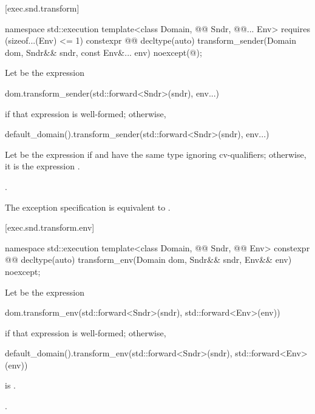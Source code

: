 [exec.snd.transform]{}

%
\begin{itemdecl}
namespace std::execution {
  template<class Domain, @@ Sndr, @@... Env>
      requires (sizeof...(Env) <= 1)
    constexpr @@ decltype(auto) transform_sender(Domain dom, Sndr&& sndr, const Env&... env)
      noexcept(@\seebelow@);
}
\end{itemdecl}

\begin{itemdescr}
\pnum
Let  be the expression
\begin{codeblock}
dom.transform_sender(std::forward<Sndr>(sndr), env...)
\end{codeblock}
if that expression is well-formed; otherwise,
\begin{codeblock}
default_domain().transform_sender(std::forward<Sndr>(sndr), env...)
\end{codeblock}
Let  be the expression 
if  and 
have the same type ignoring cv-qualifiers;
otherwise, it is
the expression .

\pnum
\returns
{}.

\pnum
\remarks
The exception specification is equivalent to
.
\end{itemdescr}

[exec.snd.transform.env]{}

%
\begin{itemdecl}
namespace std::execution {
  template<class Domain, @@ Sndr, @@ Env>
    constexpr @@ decltype(auto) transform_env(Domain dom, Sndr&& sndr, Env&& env) noexcept;
}
\end{itemdecl}

\begin{itemdescr}
\pnum
Let  be the expression
\begin{codeblock}
dom.transform_env(std::forward<Sndr>(sndr), std::forward<Env>(env))
\end{codeblock}
if that expression is well-formed; otherwise,
\begin{codeblock}
default_domain().transform_env(std::forward<Sndr>(sndr), std::forward<Env>(env))
\end{codeblock}

\pnum
\mandates
{} is .

\pnum
\returns
{}.
\end{itemdescr}

